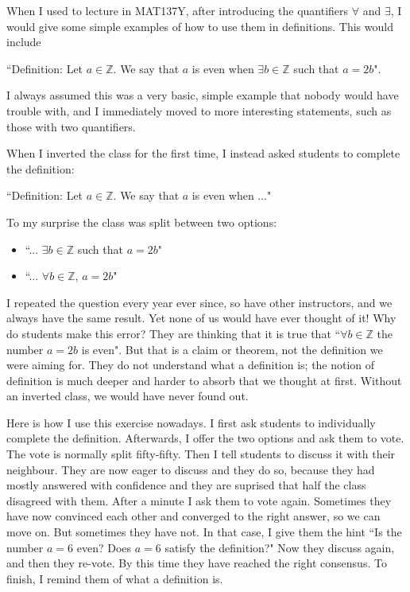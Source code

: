 \documentclass[11pt]{article}
\begin{document}
\begin{example}  \label{even}
{\baselineskip
When I used to lecture in MAT137Y, after introducing the quantifiers $\forall$ and $\exists$, I would give some simple examples of how to use them in definitions.  This would include
%
\begin{center}
``Definition:  Let $a \in \mathbb{Z}$.  We say that $a$ is even when $\exists b \in \mathbb{Z}$ such that $a=2b$".
\end{center}
%
I always assumed this was a very basic, simple example that nobody would have trouble with, and I immediately moved to more interesting statements, such as those with two quantifiers.  

\newpage
When I inverted the class for the first time, I instead asked students to complete the definition:
%
\begin{center}
``Definition:  Let $a \in \mathbb{Z}$.  We say that $a$ is even when ..."
\end{center}
%
To my surprise the class was split between two options:
	\begin{itemize}
		\item ``... $\exists b \in \mathbb{Z}$ such that $a=2b$"
		\item ``... $\forall b \in \mathbb{Z}$, $a=2b$"
	\end{itemize}
I repeated the question every year ever since, so have other instructors, and we always have the same result.  Yet none of us would have ever thought of it!   Why do students make this error?  They are thinking that it is true that ``$\forall b \in \mathbb{Z}$ the number $a=2b$ is even".  But that is a claim or theorem, not the definition we were aiming for.   They do not understand what a definition is; the notion of definition is much deeper and harder to absorb that we thought at first.  Without an inverted class, we would have never found out.

Here is how I use this exercise nowadays.  I first ask students to individually complete the definition.  Afterwards, I offer the two options and ask them to vote.  The vote is normally split fifty-fifty.   Then I tell students to discuss it with their neighbour.  They are now eager to discuss and they do so, because they had mostly answered with confidence and they are suprised that half the class disagreed with them.  After a minute I ask them to vote again.  Sometimes they have now convinced each other and converged to the right answer, so we can move on.  But sometimes they have not.  In that case, I give them the hint ``Is the number $a=6$ even?  Does $a=6$ satisfy the definition?"  Now they discuss again, and then they re-vote.  By this time they have reached the right consensus.  To finish, I remind them of what a definition is.
}
\end{example}
\end{document}
